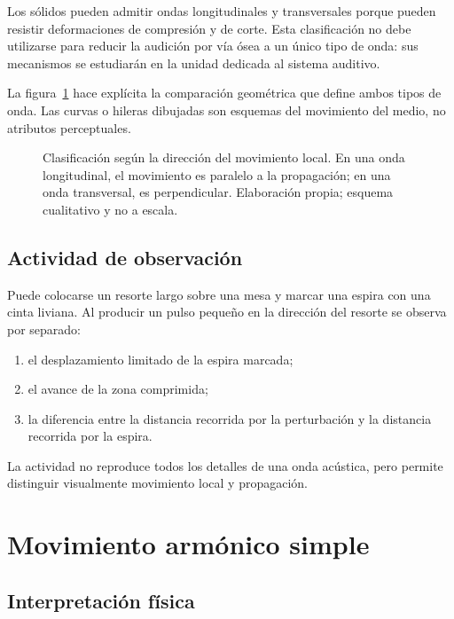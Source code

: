 Los sólidos pueden admitir ondas longitudinales y transversales porque pueden
resistir deformaciones de compresión y de corte. Esta clasificación no debe
utilizarse para reducir la audición por vía ósea a un único tipo de onda: sus
mecanismos se estudiarán en la unidad dedicada al sistema auditivo.

La figura~\ref{fig:u3-longitudinal-transversal} hace explícita la comparación
geométrica que define ambos tipos de onda. Las curvas o hileras dibujadas son
esquemas del movimiento del medio, no atributos perceptuales.

\begin{figure}[htbp]
    \centering
    
    \caption{Clasificación según la dirección del movimiento local. En una
    onda longitudinal, el movimiento es paralelo a la propagación; en una
    onda transversal, es perpendicular. Elaboración propia; esquema
    cualitativo y no a escala.}
    \label{fig:u3-longitudinal-transversal}
\end{figure}

\subsection{Actividad de observación}
\label{sec:u3-actividad-onda}

Puede colocarse un resorte largo sobre una mesa y marcar una espira con una
cinta liviana. Al producir un pulso pequeño en la dirección del resorte se
observa por separado:

\begin{enumerate}
    \item el desplazamiento limitado de la espira marcada;
    \item el avance de la zona comprimida;
    \item la diferencia entre la distancia recorrida por la perturbación y la
    distancia recorrida por la espira.
\end{enumerate}

La actividad no reproduce todos los detalles de una onda acústica, pero
permite distinguir visualmente movimiento local y propagación.

\section{Movimiento armónico simple}
\label{sec:u3-mas}

\subsection{Interpretación física}
\label{sec:u3-mas-interpretacion}

